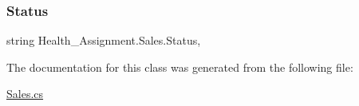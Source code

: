 \mbox{\label{class_health___assignment_1_1_sales_a00a1f4c6d8659e41a022c71de0c37d79}} 
\subsubsection{\texorpdfstring{Status}{Status}}
{\footnotesize\ttfamily string Health\+\_\+\+Assignment.\+Sales.\+Status\hspace{0.3cm}{\ttfamily [get]}, {\ttfamily [set]}}



The documentation for this class was generated from the following file\+:\begin{DoxyCompactItemize}
\item 
\hyperlink{_sales_8cs}{Sales.\+cs}\end{DoxyCompactItemize}
